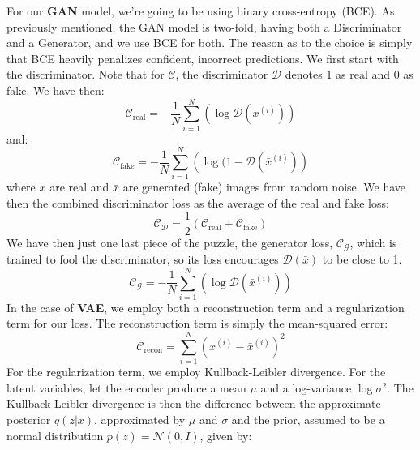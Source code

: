 \documentclass{article}
\begin{document}
For our \textbf{GAN} model, we're going to be using binary cross-entropy (BCE). As previously mentioned, the GAN model is two-fold, having both a Discriminator and a Generator, and we use BCE for both. The reason as to the choice is simply that BCE heavily penalizes confident, incorrect predictions.
\newline
We first start with the discriminator. Note that for $\mathcal{C}$, the discriminator $\mathcal{D}$ denotes $1$ as real and $0$ as fake. We have then:
\begin{equation}
    \mathcal{C}_{\text{real}} = -\frac{1}{N} \sum_{i=1}^N \left( \log \mathcal{D}(x^{(i)}) \right)
\end{equation}
and:
\begin{equation}
    \mathcal{C}_{\text{fake}} = - \frac{1}{N} \sum_{i=1}^N \left( \log(1 - \mathcal{D}(\bar x ^{(i)}) \right)
\end{equation}
where $x$ are real and $\bar x$ are generated (fake) images from random noise. \newline
We have then the combined discriminator loss as the average of the real and fake loss:
\begin{equation}
    \mathcal{C}_{\mathcal{D}} = \frac{1}{2} ( \mathcal{C}_{\text{real}} + \mathcal{C}_{\text{fake}})
\end{equation}
We have then just one last piece of the puzzle, the generator loss, $\mathcal{C}_{\mathcal{G}}$, which is trained to fool the discriminator, so its loss encourages $\mathcal{D} (\bar x)$ to be close to 1.
\begin{equation}
    \mathcal{C}_{\mathcal{G}} = - \frac{1}{N} \sum_{i=1}^N \left( \log \mathcal{D} (\bar x ^{(i)}) \right)
\end{equation}
\newline
In the case of \textbf{VAE}, we employ both a reconstruction term and a regularization term for our loss. \newline
The reconstruction term is simply the mean-squared error:
\begin{equation}
    \mathcal{C}_{\text{recon}} = \sum_{i=1}^N \left( x^{(i)} - \bar x^{(i)} \right)^2
\end{equation}
For the regularization term, we employ Kullback-Leibler divergence. For the latent variables, let the encoder produce a mean $\mu$ and a log-variance $\log \sigma^2$. The Kullback-Leibler divergence is then the difference between the approximate posterior $q(z|x)$, approximated by $\mu$ and $\sigma$ and the prior, assumed to be a normal distribution $p(z) = \mathcal{N}(0, I)$, given by:
\end{document}
